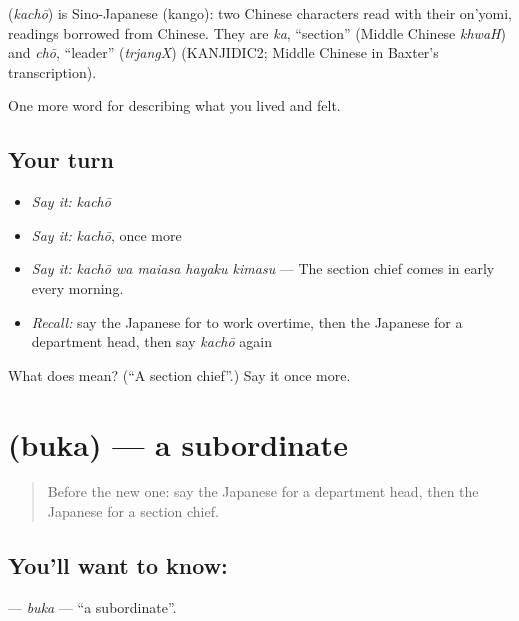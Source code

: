 \begin{cousinweb}
\textbf{} (\emph{kachō}) is Sino-Japanese (kango): two Chinese characters read with their on'yomi, readings borrowed from Chinese. They are \emph{ka}, \textquotedblleft{}section\textquotedblright{} (Middle Chinese \emph{khwaH}) and \emph{chō}, \textquotedblleft{}leader\textquotedblright{} (\emph{trjangX}) (KANJIDIC2; Middle Chinese in Baxter's transcription).
\end{cousinweb}

\begin{grammarlens}[title={What you've built}]
One more word for describing what you lived and felt.
\end{grammarlens}

\subsection*{Your turn}
\begin{itemize}
\raggedright
  \item \emph{Say it:} \emph{kachō}
  \item \emph{Say it:} \emph{kachō}, once more
  \item \emph{Say it:} \emph{kachō wa maiasa hayaku kimasu} — The section chief comes in early every morning.
  \item \emph{Recall:} say the Japanese for to work overtime, then the Japanese for a department head, then say \emph{kachō} again
\end{itemize}

\begin{tcolorbox}[breakable,colback=teal!4,colframe=teal!35!black,title={Before you move on}]
What does  mean? (\textquotedblleft{}A section chief\textquotedblright{}.) Say it once more.
\end{tcolorbox}
\section[\texorpdfstring{\ja{ぶか} (buka)}{ぶか (buka)}]{ (buka) — a subordinate}

\label{lesson:JA-C452-buka}



\begin{quote}
Before the new one: say the Japanese for a department head, then the Japanese for a section chief.
\end{quote}

\subsection*{You'll want to know: }
\textbf{} — \emph{buka} — \textquotedblleft{}a subordinate\textquotedblright{}.

